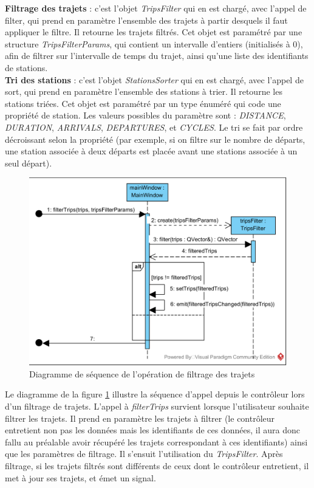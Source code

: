 \documentclass[12pt]{article}
\begin{document}
	\textbf{Filtrage des trajets} : c’est l’objet \textit{TripsFilter} qui en est chargé, avec l’appel de filter, qui prend en paramètre l’ensemble des trajets à partir desquels il faut appliquer le filtre. Il retourne les trajets filtrés. Cet objet est paramétré par une structure \textit{TripsFilterParams}, qui contient un intervalle d’entiers (initialisés à 0), afin de filtrer sur l’intervalle de temps du trajet, ainsi qu’une liste des identifiants de stations.\\

	\textbf{Tri des stations} : c’est l’objet \textit{StationsSorter} qui en est chargé, avec l’appel de sort, qui prend en paramètre l’ensemble des stations à trier. Il retourne les stations triées. Cet objet est paramétré par un type énuméré qui code une propriété de station. Les valeurs possibles du paramètre sont : \textit{DISTANCE}, \textit{DURATION}, \textit{ARRIVALS}, \textit{DEPARTURES}, et \textit{CYCLES}. Le tri se fait par ordre décroissant selon la propriété (par exemple, si on filtre sur le nombre de départs, une station associée à deux départs est placée avant une stations associée à un seul départ).\\
	
	\begin{figure}[!h]
	\begin{center}
	\includegraphics[scale=1]{dia_sequence_filterTrips.png}
	\caption{Diagramme de séquence de l’opération de filtrage des trajets}
	\label{fig:filterTrips}
	\end{center}
	\end{figure}

	Le diagramme de la figure \ref{fig:filterTrips} illustre la séquence d’appel depuis le contrôleur lors d’un filtrage de trajets. L’appel à \textit{filterTrips} survient lorsque l’utilisateur souhaite filtrer les trajets. Il prend en paramètre les trajets à filtrer (le contrôleur entretient non pas les données mais les identifiants de ces données, il aura donc fallu au préalable avoir récupéré les trajets correspondant à ces identifiants) ainsi que les paramètres de filtrage. Il s’ensuit l’utilisation du \textit{TripsFilter}. Après filtrage, si les trajets filtrés sont différents de ceux dont le contrôleur entretient, il met à jour ses trajets, et émet un signal.\\
	
\end{document}
